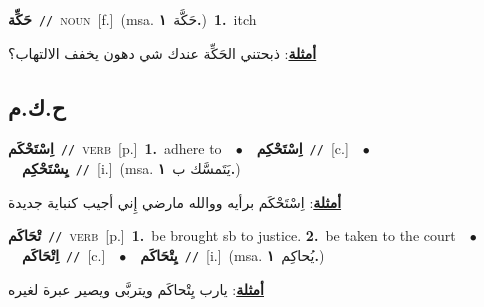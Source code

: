 \documentclass[10pt,a4paper,twoside]{article} %
\begin{document}
\begin{multicols}{2}
{\setlength\topsep{0pt}\textbf{\foreignlanguage{arabic}{حَكِّة}}\ {\color{gray}\texttt{//}\color{black}}\ \textsc{noun}\ [f.]\ \color{gray}(msa. \foreignlanguage{arabic}{حَكَّة}~\foreignlanguage{arabic}{\textbf{١.}})\color{black}\ \textbf{1.}~itch\  \begin{flushright}\color{gray}\foreignlanguage{arabic}{\textbf{\underline{\foreignlanguage{arabic}{أمثلة}}}: ذبحتني الحَكِّة عندك شي دهون يخفف الالتهاب؟}\end{flushright}\color{black}} \vspace{2mm}

\vspace{-3mm}
\subsection*{\color{blue}\foreignlanguage{arabic}{ح.ك.م}\color{blue}{}} 

{\setlength\topsep{0pt}\textbf{\foreignlanguage{arabic}{اِسْتَحْكَم}}\ {\color{gray}\texttt{//}\color{black}}\ \textsc{verb}\ [p.]\ \textbf{1.}~adhere to\ \ $\bullet$\ \ \setlength\topsep{0pt}\textbf{\foreignlanguage{arabic}{اِسْتَحْكِم}}\ {\color{gray}\texttt{//}\color{black}}\ [c.]\ \ $\bullet$\ \ \setlength\topsep{0pt}\textbf{\foreignlanguage{arabic}{يِسْتَحْكِم}}\ {\color{gray}\texttt{//}\color{black}}\ [i.]\ \color{gray}(msa. \foreignlanguage{arabic}{يَتَمسَّك ب}~\foreignlanguage{arabic}{\textbf{١.}})\color{black}\  \begin{flushright}\color{gray}\foreignlanguage{arabic}{\textbf{\underline{\foreignlanguage{arabic}{أمثلة}}}: اِسْتَحْكَم برأيه ووالله مارضي إِني أجيب كنباية جديدة}\end{flushright}\color{black}} \vspace{2mm}

{\setlength\topsep{0pt}\textbf{\foreignlanguage{arabic}{تْحَاكَم}}\ {\color{gray}\texttt{//}\color{black}}\ \textsc{verb}\ [p.]\ \textbf{1.}~be brought sb to justice.  \textbf{2.}~be taken to the court\ \ $\bullet$\ \ \setlength\topsep{0pt}\textbf{\foreignlanguage{arabic}{اِتْحَاكَم}}\ {\color{gray}\texttt{//}\color{black}}\ [c.]\ \ $\bullet$\ \ \setlength\topsep{0pt}\textbf{\foreignlanguage{arabic}{يِتْحَاكَم}}\ {\color{gray}\texttt{//}\color{black}}\ [i.]\ \color{gray}(msa. \foreignlanguage{arabic}{يُحاكِم}~\foreignlanguage{arabic}{\textbf{١.}})\color{black}\  \begin{flushright}\color{gray}\foreignlanguage{arabic}{\textbf{\underline{\foreignlanguage{arabic}{أمثلة}}}: يارب يِتْحاكَم ويتربَّى ويصير عبرة لغيره}\end{flushright}\color{black}} \vspace{2mm}


\end{multicols}
\end{document}

